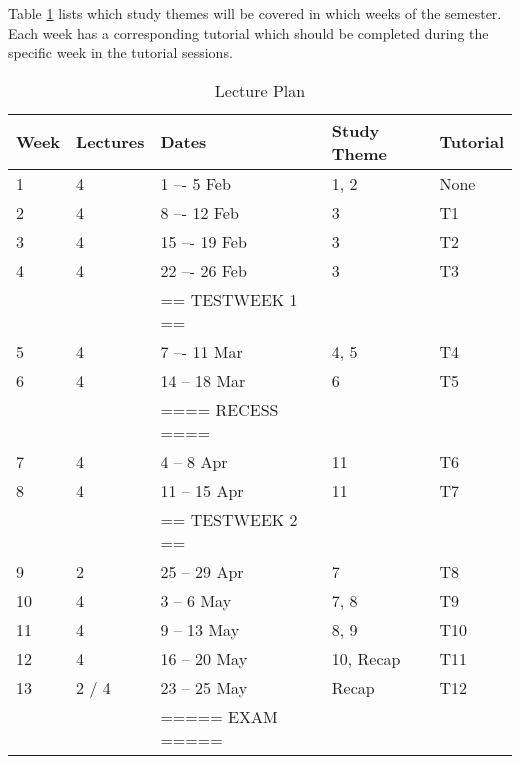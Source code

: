         Table \ref{tab:lec_plan} lists which study themes will be covered
        in which weeks of the semester. Each week has a corresponding tutorial
        which should be completed during the specific week in the tutorial
        sessions.

        \begin{table}[!h]
            \begin{center}
             \begin{tabular}{|l|l|l|l|l|}
                 \hline
                 {\bf Week} & {\bf Lectures} & {\bf Dates} & %
                 {\bf Study Theme} & {\bf Tutorial} \\
                 \hline
                 1  & 4     &  1 –-  5 Feb     & 1, 2  & None \\
                 2  & 4     &  8 –- 12 Feb     & 3     & T1 \\
                 3  & 4     & 15 –- 19 Feb     & 3     & T2 \\
                 4  & 4     & 22 –- 26 Feb     & 3     & T3 \\
                    &       & == TESTWEEK 1 == &       & \\
                 5  & 4     &  7 –- 11 Mar     & 4, 5  & T4 \\
                 6  & 4     & 14 -- 18 Mar     & 6     & T5 \\
                    &       & ==== RECESS ==== &       & \\
                 7  & 4     &  4 --  8 Apr     & 11    & T6 \\
                 8  & 4     & 11 -- 15 Apr     & 11    & T7 \\
                    &       & == TESTWEEK 2 == &       & \\
                 9  & 2     & 25 -- 29 Apr     & 7     & T8 \\
                 10 & 4     &  3 --  6 May     & 7, 8  & T9 \\
                 11 & 4     &  9 -- 13 May     & 8, 9  & T10 \\
                 12 & 4     & 16 -- 20 May     & 10, Recap & T11 \\
                 13 & 2 / 4 & 23 -- 25 May     & Recap & T12 \\
                    &       & ===== EXAM ===== &       & \\
                 \hline
             \end{tabular}
             \caption{Lecture Plan} \label{tab:lec_plan}
            \end{center}
        \end{table}

